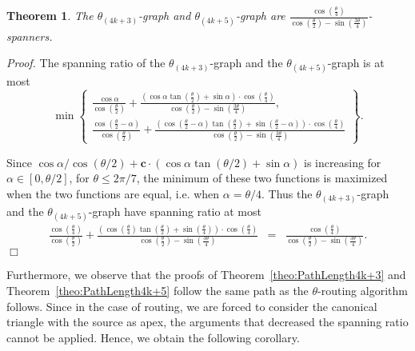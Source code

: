 \documentclass[12pt]{article}
\newtheorem{theo}[defin]{Theorem}
\newenvironment{theorem}{\begin{theo} \sl}{\end{theo}}
\newenvironment{proof}{\emph{Proof.}}{\hfill $\Box$\\}
\newcommand{\graph}[1]{\ensuremath{\theta_{(4 k + #1)}}-graph\xspace}
\newcommand{\const}{\ensuremath{\boldsymbol{c}}\xspace}
\begin{document}
\begin{theorem}
  \label{theo:SpanningRatio4k+3,5}
  The \graph{3} and \graph{5} are $\frac{\cos \left(\frac{\theta}{4}\right)}{\cos \left(\frac{\theta}{2}\right) - \sin \left(\frac{3\theta}{4}\right)}$-spanners. 
\end{theorem}
\begin{proof}
  The spanning ratio of the \graph{3} and the \graph{5} is at most 
  \[ \min \left\{
  \begin{array}{l}
    \frac{\cos \alpha}{\cos \left(\frac{\theta}{2}\right)} + \frac{\left( \cos \alpha \tan \left(\frac{\theta}{2}\right) + \sin \alpha \right) \cdot \cos \left(\frac{\theta}{4}\right)}{\cos \left(\frac{\theta}{2}\right) - \sin \left(\frac{3\theta}{4}\right)}, \\
    \frac{\cos \left(\frac{\theta}{2} - \alpha\right)}{\cos \left(\frac{\theta}{2}\right)} + \frac{\left( \cos \left(\frac{\theta}{2} - \alpha\right) \tan \left(\frac{\theta}{2}\right) + \sin \left(\frac{\theta}{2} - \alpha\right) \right) \cdot \cos \left(\frac{\theta}{4}\right)}{\cos \left(\frac{\theta}{2}\right) - \sin \left(\frac{3\theta}{4}\right)}
  \end{array}
  \right\}.
  \]

  Since $\cos \alpha / \cos (\theta/2) + \const \cdot (\cos \alpha \tan (\theta/2) + \sin \alpha)$ is increasing for $\alpha \in [0, \theta/2]$, for $\theta \leq 2\pi/7$, the minimum of these two functions is maximized when the two functions are equal, i.e. when $\alpha = \theta/4$. Thus the \graph{3} and the \graph{5} have spanning ratio at most 
  \begin{eqnarray*}
    \frac{\cos \left(\frac{\theta}{4}\right)}{\cos \left(\frac{\theta}{2}\right)} + \frac{\left( \cos \left(\frac{\theta}{4}\right) \tan \left(\frac{\theta}{2}\right) + \sin \left(\frac{\theta}{4}\right) \right) \cdot \cos \left(\frac{\theta}{4}\right)}{\cos \left(\frac{\theta}{2}\right) - \sin \left(\frac{3\theta}{4}\right)}
    &=& \frac{\cos \left(\frac{\theta}{4}\right)}{\cos \left(\frac{\theta}{2}\right) - \sin \left(\frac{3\theta}{4}\right)}. 
  \end{eqnarray*} 
\end{proof}

Furthermore, we observe that the proofs of Theorem~\ref{theo:PathLength4k+3} and Theorem~\ref{theo:PathLength4k+5} follow the same path as the $\theta$-routing algorithm follows. Since in the case of routing, we are forced to consider the canonical triangle with the source as apex, the arguments that decreased the spanning ratio cannot be applied. Hence, we obtain the following corollary. 
\end{document}
